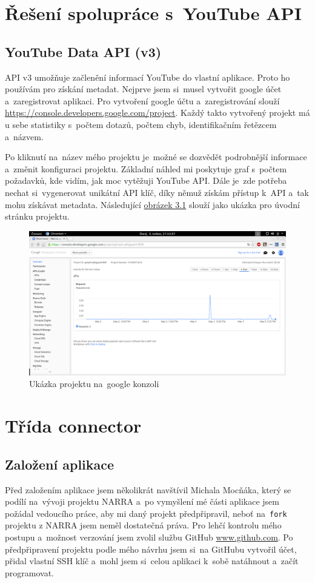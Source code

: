 \section{Řešení spolupráce s~YouTube API}
\subsection{YouTube Data API (v3)}
\par API v3\cite{apiv3} umožňuje začlenění informací YouTube do vlastní aplikace. Proto ho používám pro získání metadat. Nejprve jsem si~musel vytvořit google účet a~zaregistrovat aplikaci. Pro vytvoření google účtu a~zaregistrování slouží \url{https://console.developers.google.com/project}\cite{googleconsole}. Každý takto vytvořený projekt má u sebe statistiky s~počtem dotazů, počtem chyb, identifikačním řetězcem a~názvem. 
\par Po kliknutí na~název mého projektu je~možné se dozvědět podrobnější informace a~změnit konfiguraci projektu. Základní náhled mi poskytuje graf s~počtem požadavků, kde vidím, jak moc vytěžuji YouTube API\cite{apiv3}. Dále je~zde potřeba nechat si~vygenerovat unikátní API klíč, díky němuž získám přístup k~API a~tak mohu získávat metadata. Následující \hyperlink{consolesample}{obrázek 3.1} slouží jako ukázka pro úvodní stránku projektu.
\begin{figure}[h!]
	\hypertarget{consolesample}{}
	\centering
	\includegraphics[width=\textwidth]{obrazova_priloha/my_projekt.png}
	\caption{Ukázka projektu na~google konzoli}
\end{figure}

\section{Třída connector}
\subsection{Založení aplikace}
\par Před založením aplikace jsem několikrát navštívil Michala Mocňáka, který se podílí na~vývoji projektu NARRA a~po vymyšlení mé části aplikace jsem požádal vedoucího práce, aby mi daný projekt předpřipravil, neboť na~\texttt{fork} projektu z NARRA jsem neměl dostatečná práva. Pro lehčí kontrolu mého postupu a~možnost verzování jsem zvolil službu GitHub \url{www.github.com}\cite{git}. Po předpřipravení projektu podle mého návrhu jsem si~na GitHubu vytvořil účet, přidal vlastní SSH klíč a~mohl jsem si~celou aplikaci k~sobě natáhnout a~začít programovat.


